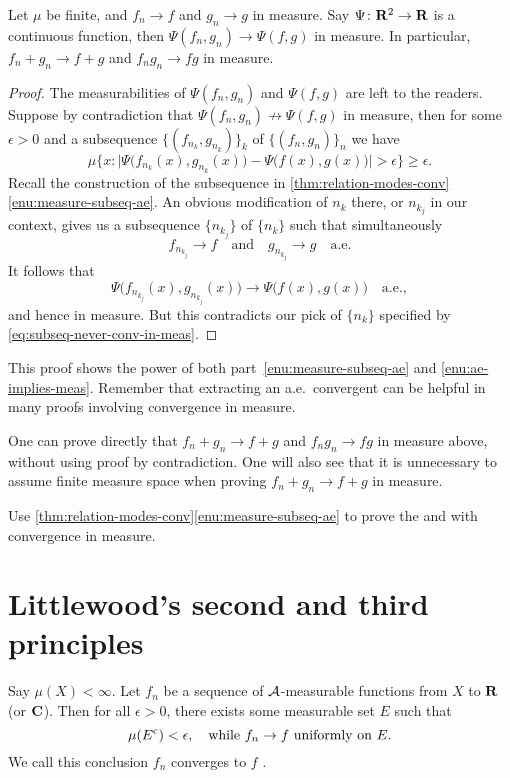 \begin{cor}
    Let $\mu$ be finite, and $f_n \to f$ and $g_n \to g$ in measure. Say $\Psi\colon \mathbf{R}^2 \to \mathbf{R}$ is a continuous function, then $\Psi(f_n,g_n) \to \Psi(f,g)$ in measure. In particular, $f_n + g_n \to f + g$ and $f_n g_n \to fg$ in measure.
\end{cor}
\begin{proof}
    The measurabilities of $\Psi(f_n,g_n)$ and $\Psi(f,g)$ are left to the readers. Suppose by contradiction that $\Psi(f_n,g_n) \not\to \Psi(f,g)$ in measure, then for some $\epsilon > 0$ and a subsequence $\{(f_{n_k},g_{n_k})\}_k$ of $\{(f_n,g_n)\}_n$ we have \begin{equation}
        \mu\bigl\{x: \bigl\vert\Psi\bigl(f_{n_k}(x),g_{n_k}(x)\bigr) - \Psi\bigl(f(x),g(x)\bigr)\bigr\vert > \epsilon \bigr\} \geq\epsilon. \label{eq:subseq-never-conv-in-meas}
    \end{equation} Recall the construction of the subsequence in \cref{thm:relation-modes-conv}\ref{enu:measure-subseq-ae}. An obvious modification of $n_k$ there, or $n_{k_j}$ in our context, gives us a subsequence $\{n_{k_j}\}$ of $\{n_k\}$ such that simultaneously \[
        f_{n_{k_j}} \to f \quad \text{and} \quad g_{n_{k_j}} \to g\quad\text{a.e.}
    \] It follows that \[
        \Psi\bigl(f_{n_{k_j}}(x),g_{n_{k_j}}(x)\bigr) \to  \Psi\bigl(f(x),g(x)\bigr) \quad\text{a.e.},
    \] and hence in measure. But this contradicts our pick of $\{n_k\}$ specified by \eqref{eq:subseq-never-conv-in-meas}.
\end{proof}

This proof shows the power of both part~\ref{enu:measure-subseq-ae} and \ref{enu:ae-implies-meas}. Remember that extracting an a.e.\ convergent can be helpful in many proofs involving convergence in measure.

\begin{rem}
    One can prove directly that $f_n + g_n \to f+g$ and $f_ng_n \to fg$ in measure above, without using proof by contradiction. One will also see that it is unnecessary to assume finite measure space when proving $f_n + g_n \to f + g$ in measure.
\end{rem}

\begin{xca}
Use \cref{thm:relation-modes-conv}\ref{enu:measure-subseq-ae} to prove the  and  with convergence in measure.
\end{xca}

\section{Littlewood's second and third principles} \label{sec:Littlewood-2nd-3rd}
\begin{namedthm} \label{thm:Egoroff}
    Say $\mu(X)<\infty$. Let ${f_n}$ be a sequence of $\mathcal{A}$-measurable functions from $X$ to $\mathbf{R}$ (or $\mathbf{C}$). Then for all $\epsilon > 0$, there exists some measurable set $E$ such that \[
        \mu(E^{\mathrm{c}}) < \epsilon, \quad \text{while } f_n \to f \text{ uniformly on } E.
    \]
    We call this conclusion $f_n$ converges to $f$ .
\end{namedthm}

